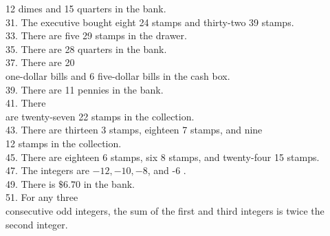 \documentclass{ximera}
\begin{document}
12 dimes and 15 quarters in the bank.\\
31. The executive bought eight 24\textcent{} stamps and thirty-two 39\textcent{} stamps.\\
33. There are five 29\textcent{} stamps in the drawer.\\
35. There are 28 quarters in the bank.\\
37. There are 20\\
one-dollar bills and 6 five-dollar bills in the cash box.\\
39. There are 11 pennies in the bank.\\
41. There\\
are twenty-seven 22\textcent{} stamps in the collection.\\
43. There are thirteen 3\textcent{} stamps, eighteen 7\textcent{} stamps, and nine\\
12\textcent{} stamps in the collection.\\
45. There are eighteen 6\textcent{} stamps, six 8\textcent{} stamps, and twenty-four 15\textcent{} stamps.\\
47. The integers are $-12,-10,-8$, and -6 .\\
49. There is $\$ 6.70$ in the bank.\\
51. For any three\\
consecutive odd integers, the sum of the first and third integers is twice the second integer.
\end{document}
